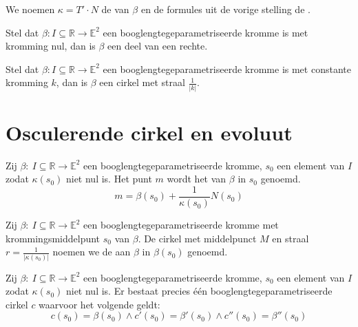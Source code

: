 \documentclass[main.tex]{subfiles}
\begin{document}
\begin{de}
  We noemen $\kappa= T'\cdot N$ de  van $\beta$ en de formules uit de vorige stelling de .
\end{de}

\begin{st}
  Stel dat $\beta: I \subseteq \mathbb{R} \rightarrow \mathbb{E}^{2}$ een booglengtegeparametriseerde kromme is met kromming nul, dan is $\beta$ een deel van een rechte.
\end{st}

\begin{st}
  Stel dat $\beta: I \subseteq \mathbb{R} \rightarrow \mathbb{E}^{2}$ een booglengtegeparametriseerde kromme is met constante kromming $k$, dan is $\beta$ een cirkel met straal $\frac{1}{|k|}$.
\end{st}

\section{Osculerende cirkel en evoluut}
\label{sec:oscul-cirk-en}

\begin{de}
  Zij $\beta:\ I \subseteq \mathbb{R} \rightarrow \mathbb{E}^{2}$ een booglengtegeparametriseerde kromme, $s_{0}$ een element van $I$ zodat $\kappa(s_{0})$ niet nul is.
  Het punt $m$ wordt het  van $\beta$ in $s_{0}$ genoemd.
  \[ m = \beta(s_{0}) + \frac{1}{\kappa(s_{0})}N(s_{0})\]
\end{de}

\begin{de}
  Zij $\beta:\ I \subseteq \mathbb{R} \rightarrow \mathbb{E}^{2}$ een booglengtegeparametriseerde kromme met krommingsmiddelpunt $s_{0}$ van $\beta$.
  De cirkel met middelpunct $M$ en straal $r= \frac{1}{|\kappa(s_{0})|}$ noemen we de  aan $\beta$ in $\beta(s_{0})$ genoemd.
\end{de}

\begin{st}
  Zij $\beta:\ I \subseteq \mathbb{R} \rightarrow \mathbb{E}^{2}$ een booglengtegeparametriseerde kromme, $s_{0}$ een element van $I$ zodat $\kappa(s_{0})$ niet nul is.
  Er bestaat precies \'e\'en booglengtegeparametriseerde cirkel $c$ waarvoor het volgende geldt:
  \[ c(s_{0}) = \beta(s_{0}) \wedge c'(s_{0}) = \beta'(s_{0}) \wedge c''(s_{0}) = \beta''(s_{0})\]
\end{st}
\end{document}
